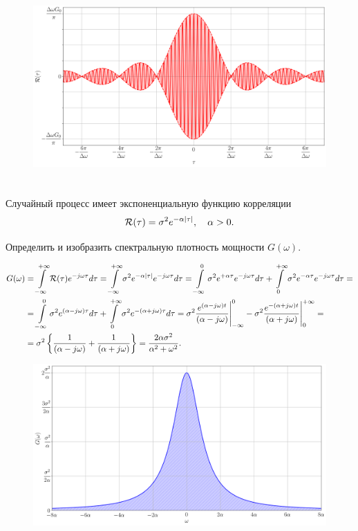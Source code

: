 \begin{figure}[!h]
	\centering
	\includegraphics[width=0.9\columnwidth]{pics/spring/5/1.png}
	\label{fig:5-1}
\end{figure}

\newpage
\section{}
Случайный процесс имеет экспоненциальную функцию корреляции
\begin{equation*}
\mathcal{R}(\tau) = \sigma^2 e^{-\alpha |\tau|},\quad \alpha>0.
\end{equation*}

Определить и изобразить спектральную плотность мощности $G(\omega)$.

\begin{align*}
G(\omega) &= \int \limits_{-\infty}^{+\infty}\mathcal{R}(\tau)e^{-j\omega\tau}d\tau =
\int \limits_{-\infty}^{+\infty}\sigma^2 e^{-\alpha |\tau|}e^{-j\omega\tau}d\tau =
\int \limits_{-\infty}^{0}\sigma^2 e^{+\alpha \tau}e^{-j\omega\tau}d\tau + 
\int \limits_{0}^{+\infty}\sigma^2 e^{-\alpha \tau}e^{-j\omega\tau}d\tau =\\&=
\int \limits_{-\infty}^{0}\sigma^2e^{(\alpha - j\omega) \tau}d\tau + 
\int \limits_{0}^{+\infty}\sigma^2e^{-(\alpha + j\omega)\tau}d\tau =
\sigma^2 \dfrac{e^{(\alpha - j\omega)t}}{(\alpha - j\omega)}\Bigg|_{-\infty}^{0} -
\sigma^2 \dfrac{e^{-(\alpha + j\omega)t}}{(\alpha + j\omega)}\Bigg|_{0}^{+\infty} = \\&=
\sigma^2 \left\{ \dfrac{1}{(\alpha - j\omega)} + \dfrac{1}{(\alpha + j\omega)}\right\} =
\dfrac{2 \alpha \sigma^2}{\alpha^2 + \omega^2}.
\end{align*}


\begin{figure}[!h]
	\centering
	\includegraphics[width=0.9\columnwidth]{pics/spring/5/2.png}
	\label{fig:5-2}
\end{figure}

